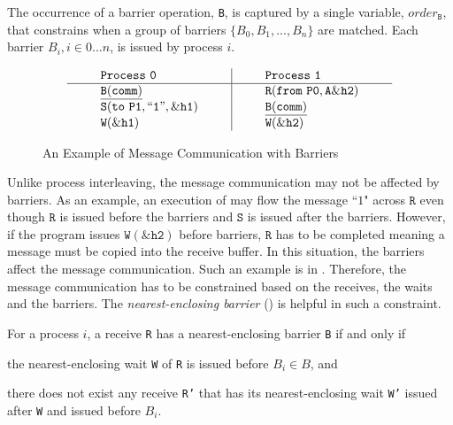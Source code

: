 \begin{definition}[Barrier]\label{def:barrier}
The occurrence of a barrier operation, \texttt{B}, is captured by a
single variable, $\mathit{order}_\mathtt{B}$, that constrains when a group of barriers $\{B_0, B_1, ..., B_n\}$ are matched.  
Each barrier $B_i, i\in{0 ... n}$, is issued by process $i$. 
\end{definition}

\begin{figure}[h]
\[
\begin{array}{l|l}
\;\;\;\;\;\;\;\;\mathtt{Process\ 0}\;\;\;\;\;\;\;\; & \;\;\;\;\;\;\;\; \mathtt{Process\ 1}\;\;\;\;\;\;\;\; \\
\hline
\;\;\;\;\;\;\;\;\mathtt{\underline{B(comm)}}\;\;\;\;\;\;\;\; & \;\;\;\;\;\;\;\; \mathtt{R(from\ P0,A\&h2)}\;\;\;\;\;\;\;\; \\
\;\;\;\;\;\;\;\;\mathtt{S(to\ P1,``1",\&h1)}\;\;\;\;\;\;\;\; & \;\;\;\;\;\;\;\; \mathtt{\underline{B(comm)}}\;\;\;\;\;\;\;\; \\
\;\;\;\;\;\;\;\;\mathtt{W(\&h1)}\;\;\;\;\;\;\;\; & \;\;\;\;\;\;\;\; \mathtt{W(\&h2)}\;\;\;\;\;\;\;\; \\
\end{array}
\]
\caption{An Example of Message Communication with Barriers} \label{fig:mc_barrier1}
\end{figure}

Unlike process interleaving, the message communication may not be affected by barriers. As an example, an execution of  may flow the message ``$1$" across $\mathtt{R}$ even though $\mathtt{R}$ is issued before the barriers and $\mathtt{S}$ is issued after the barriers. However, if the program issues $\mathtt{W(\&h2)}$ before barriers, $\mathtt{R}$ has to be completed meaning a message must be copied into the receive buffer. In this situation, the barriers affect the message communication. Such an example is in . Therefore, the message communication has to be constrained based on the receives, the waits and the barriers. The \textit{nearest-enclosing barrier} () is helpful in such a constraint.

\begin{definition}\label{def:nb}
For a process $i$, a receive \texttt{R} has a nearest-enclosing barrier \texttt{B} if and only if
\begin{compactenum}
\item the nearest-enclosing wait \texttt{W} of \texttt{R} is issued before $B_i\in B$, and
\item there does not exist any receive \texttt{R'} that has its nearest-enclosing wait \texttt{W'} issued after \texttt{W} and issued before $B_i$.
\end{compactenum}
\end{definition}


